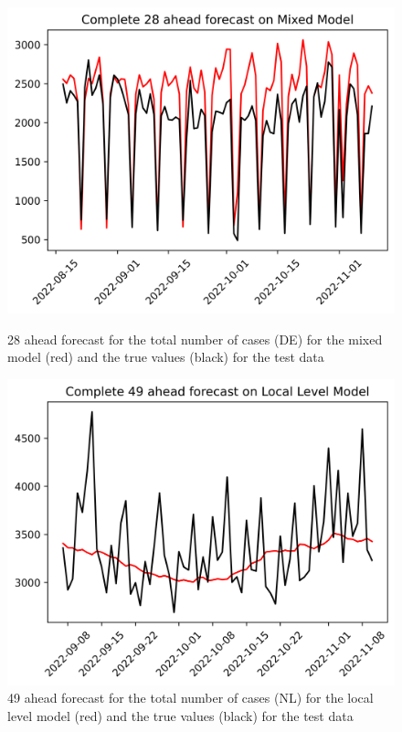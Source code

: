 \begin{figure}
\begin{minipage}{.32\textwidth}
  \centering
  \includegraphics[width=\linewidth]{pics/28_ah/DE_Complete_28_ahead_Mixed Model.png}
  \caption{28 ahead forecast for the total number of cases (DE) for the mixed model (red) and the true values (black) for the test data}
  \label{fig:tot_cases_fc_28_mix_DE}
\end{minipage}
\begin{minipage}{.32\textwidth}
  \centering
  \includegraphics[width=\linewidth]{pics/49_ah/Complete_49_ahead_Local Level Model.png}
  \caption{49 ahead forecast for the total number of cases (NL) for the local level model (red) and the true values (black) for the test data}

\end{minipage}
\end{figure}
